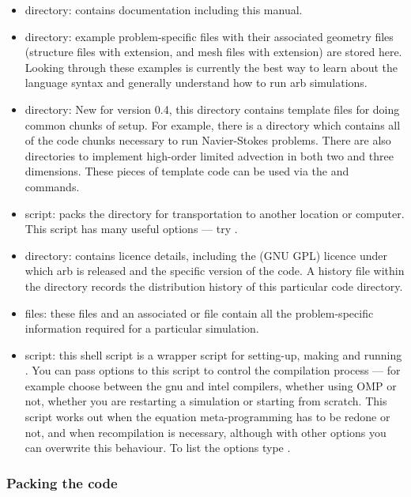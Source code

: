 \begin{itemize}
\item {} directory: contains documentation including this manual.
\item {} directory: example problem-specific  files with their associated geometry files (structure files with  extension, and mesh files with  extension) are stored here.  Looking through these examples is currently the best way to learn about the language syntax and generally understand how to run arb simulations.
\item {} directory: New for version 0.4, this directory contains template  files for doing common chunks of setup.  For example, there is a  directory which contains all of the code chunks necessary to run Navier-Stokes problems.  There are also directories to implement high-order limited advection in both two and three dimensions.  These pieces of template code can be used via the  and  commands.
\item {} script: packs the directory for transportation to another location or computer.  This script has many useful options --- try .
\item {} directory: contains licence details, including the (GNU GPL) licence under which arb is released and the specific version of the code.  A history file within the directory  records the distribution history of this particular code directory.
\item {} files: these files and an associated  or  file contain all the problem-specific information required for a particular simulation.
\item {} script: this shell script is a wrapper script for setting-up, making and running .  You can pass options to this script to control the compilation process --- for example choose between the gnu and intel compilers, whether using OMP or not, whether you are restarting a simulation or starting from scratch.  This script works out when the equation meta-programming has to be redone or not, and when recompilation is necessary, although with other options you can overwrite this behaviour.  To list the options type .
\end{itemize}
%
\subsubsection{Packing the code}

